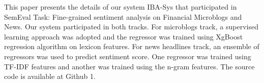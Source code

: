 This paper presents the details of our system IBA-Sys that participated in SemEval Task: Fine-grained sentiment analysis on Financial Microblogs and News. Our system participated in both tracks. For microblogs track, a supervised learning approach was adopted and the regressor was trained using XgBoost regression algorithm on lexicon features. For news headlines track, an ensemble of regressors was used to predict sentiment score. One regressor was trained using TF-IDF features and another was trained using the n-gram features. The source code is available at Github 1.
